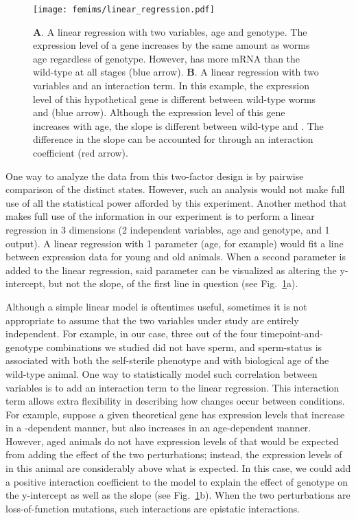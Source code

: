 \begin{figure}[htbp]
\renewcommand{\familydefault}{\sfdefault}\normalfont{}
\centering
\texttt{[image: femims/linear\_regression.pdf]}
\caption{
\textbf{A}. A linear regression with two variables, age and genotype.
The expression level of a gene increases by the same amount as worms age
regardless of genotype. However, \fog{} has more mRNA than the wild-type at all
stages (blue arrow).
\textbf{B}. A linear regression with two variables and an
interaction term. In this example, the expression level of this hypothetical
gene is different between wild-type worms and \fog{} (blue arrow). Although the
expression level of this gene increases with age, the slope is different between
wild-type and \fog{}. The difference in the slope can be accounted for through
an interaction coefficient (red arrow).
}
\label{fig:linear_reg}
\end{figure}

One way to analyze the data from this two-factor design is by pairwise
comparison of the distinct states. However, such an analysis would not make full
use of all the statistical power afforded by this experiment. Another method
that makes full use of the information in our experiment is to perform a linear
regression in 3 dimensions (2 independent variables, age and genotype, and 1
output). A linear regression with 1 parameter (age, for example) would fit a
line between expression data for young and old animals. When a second parameter
is added to the linear regression, said parameter can be visualized as altering
the y-intercept, but not the slope, of the first line in question (see
Fig.~\ref{fig:linear_reg}a).

Although a simple linear model is oftentimes useful, sometimes it is not
appropriate to assume that the two variables under study are entirely
independent. For example, in our case, three out of the four timepoint-and-genotype
combinations we studied did not have sperm, and sperm-status is
associated with both the \fog{} self-sterile phenotype and with biological age
of the wild-type animal. One way to statistically model such correlation between
variables is to add an interaction term to the linear regression.
This interaction term allows extra flexibility in describing how changes occur
between conditions.
For example, suppose a given theoretical gene  has expression levels that
increase in a -dependent manner, but also increases in an
age-dependent manner. However, aged \fog{} animals do not have expression levels
of  that would be expected from adding the effect of the two perturbations;
instead, the expression levels of  in this animal are considerably above
what is expected. In this case, we could add a positive
interaction coefficient to the model to explain the effect of genotype on the
y-intercept as well as the slope (see Fig.~\ref{fig:linear_reg}b).
When the two
perturbations are loss-of-function mutations, such interactions are epistatic
interactions.

